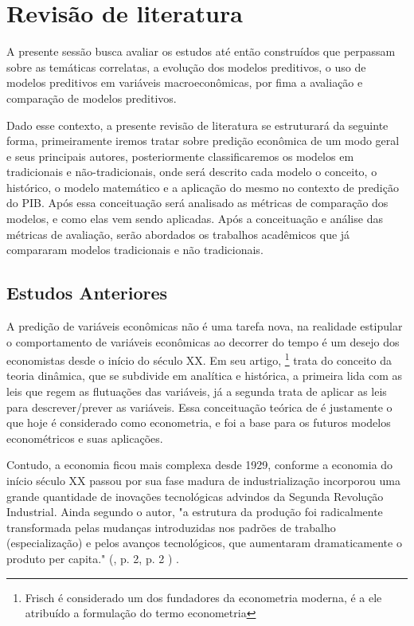 \documentclass[12pt]{article}%
\newcommand{\citem}[2][]{%
	(\citeauthoronline{#2}, \citeyear{#2}%
	\ifx#1\empty\else, #1\fi%
	)%
}
\begin{document}
	\section{Revisão de literatura}
	\label{sec:revisaodeliteratura}
	A presente sessão busca avaliar os estudos até então construídos que perpassam sobre as temáticas correlatas, a evolução dos modelos preditivos, o uso de modelos preditivos em variáveis macroeconômicas, por fima a avaliação e comparação de modelos preditivos.
	
	Dado esse contexto, a presente revisão de literatura se estruturará da seguinte forma, primeiramente iremos tratar sobre predição econômica de um modo geral e seus principais autores, posteriormente classificaremos os modelos em tradicionais e não-tradicionais, onde será descrito cada modelo o conceito, o histórico, o modelo matemático e a aplicação do mesmo no contexto de predição do PIB. Após essa conceituação será analisado as métricas de comparação dos modelos, e como elas vem sendo aplicadas. Após a conceituação e análise das métricas de avaliação, serão abordados os trabalhos acadêmicos que já compararam modelos tradicionais e não tradicionais. 
	
	\subsection{Estudos Anteriores}
	
	
	A predição de variáveis econômicas não é uma tarefa nova, na realidade  estipular o comportamento de variáveis econômicas ao decorrer do tempo é um desejo dos economistas desde o início do século XX. Em seu artigo,   \footnote{Frisch é considerado um dos fundadores da econometria moderna, é a ele atribuído a formulação do termo econometria} trata do conceito da teoria dinâmica, que se subdivide em analítica e histórica, a primeira lida com as leis que regem as flutuações das variáveis, já a segunda trata de aplicar as leis para descrever/prever as variáveis. Essa conceituação teórica de  é justamente o que hoje é considerado como econometria, e foi a base para os futuros modelos econométricos e suas aplicações.
	
	Contudo, a economia ficou mais complexa desde 1929, conforme  a economia do início século XX passou por sua fase madura de industrialização incorporou uma grande quantidade de inovações tecnológicas advindos da Segunda Revolução Industrial. Ainda segundo o autor, "a estrutura da produção foi radicalmente transformada pelas mudanças introduzidas nos padrões de trabalho (especialização) e pelos avanços tecnológicos, que aumentaram dramaticamente o produto per capita."\citem[p. 2]{almeida_2001}.
	
\end{document}

